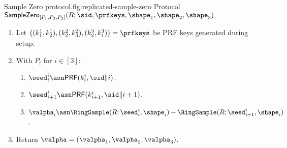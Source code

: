 \begin{Boxfig}{Sample Zero protocol.}{fig:replicated-sample-zero}
  {Protocol $\mathsf{SampleZero}_{[P_1, P_2, P_3]}(R; \sid, \prfkeys, \shape_1, \shape_2, \shape_3)$}
  
  \begin{enumerate}
  \item Let $\left( (k_1^1, k_2^1), (k_2^2, k_3^2), (k_2^3, k_1^3) \right) = \prfkeys$ be PRF keys generated during setup.
  
  \item With $P_i$ for $i \in [3]$:
  \begin{enumerate}
    \item ${\seed}^i_i \asn \mathsf{PRF}(k^i_i, \sid \| i)$.
    \item ${\seed}^i_{i+1} \asn \mathsf{PRF}(k^i_{i+1}, \sid \| i + 1)$.
    \item $\valpha_i \asn \RingSample(R; \seed^i_i, \shape_i) - \RingSample(R; \seed^i_{i+1}, \shape_i)$.
  \end{enumerate}
  
  \item Return $\valpha = \left( \valpha_1, \valpha_2, \valpha_3 \right)$.
  \end{enumerate}
\end{Boxfig}